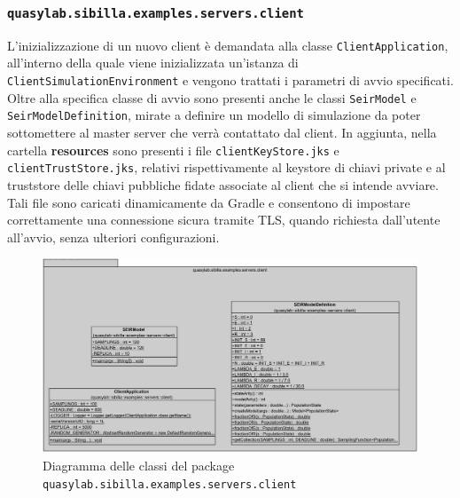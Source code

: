 \subsubsection{\texttt{quasylab.sibilla.examples.servers.client}}

L'inizializzazione di un nuovo client è demandata alla classe \texttt{ClientApplication}, all'interno della quale viene inizializzata un'istanza di \texttt{ClientSimulationEnvironment} e vengono trattati i parametri di avvio specificati.
Oltre alla specifica classe di avvio sono presenti anche le classi \texttt{SeirModel} e \texttt{SeirModelDefinition}, mirate a definire un modello di simulazione da poter sottomettere al master server che verrà contattato dal client.
In aggiunta, nella cartella \textbf{resources} sono presenti i file \texttt{clientKeyStore.jks} e \texttt{clientTrustStore.jks}, relativi rispettivamente al keystore di chiavi private e al truststore delle chiavi pubbliche fidate associate al client che si intende avviare. Tali file sono caricati dinamicamente da Gradle e consentono di impostare correttamente una connessione sicura tramite TLS, quando richiesta dall'utente all'avvio, senza ulteriori configurazioni.

\begin{figure}[H]
    \includegraphics[width=\linewidth]{images/quasylab.sibilla.examples.servers.client.png}
    \captionsetup{justification=centering}
    \caption{Diagramma delle classi del package \texttt{quasylab.sibilla.examples.servers.client}}
  \end{figure}

